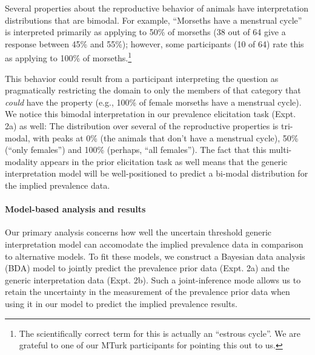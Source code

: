 \documentclass[floatsintext,doc]{apa6}
\theoremstyle{definition}
\theoremstyle{definition}
\theoremstyle{definition}
\theoremstyle{remark}
\begin{document}
Several properties about the reproductive behavior of animals have
interpretation distributions that are bimodal. For example,
\enquote{Morseths have a menstrual cycle} is interpreted primarily as
applying to 50\% of morseths (38 out of 64 give a response between 45\%
and 55\%); however, some participants (10 of 64) rate this as applying
to 100\% of morseths.\footnote{The scientifically correct term for this
  is actually an \enquote{estrous cycle}. We are grateful to one of our
  MTurk participants for pointing this out to us.} 
  
  This behavior could
result from a participant interpreting the question as pragmatically
restricting the domain to only the members of that category that
\emph{could} have the property (e.g., 100\% of female morseths have a
menstrual cycle). We notice this bimodal interpretation in our
prevalence elicitation task (Expt. 2a) as well: The distribution over
several of the reproductive properties is tri-modal, with peaks at 0\%
(the animals that don't have a menstrual cycle), 50\% (\enquote{only
females}) and 100\% (perhaps, \enquote{all females}). The fact that this
multi-modality appears in the prior elicitation task as well means that
the generic interpretation model will be well-positioned to predict a
bi-modal distribution for the implied prevalence data.

\paragraph{Model-based analysis and
results}\label{model-based-analysis-and-results-1}

Our primary analysis concerns how well the uncertain threshold generic
interpretation model can accomodate the implied prevalence data in
comparison to alternative models. To fit these models, we construct a
Bayesian data analysis (BDA) model to jointly predict the prevalence
prior data (Expt. 2a) and the generic interpretation data (Expt. 2b).
Such a joint-inference mode allows us to retain the uncertainty in the
measurement of the prevalence prior data when using it in our model to
predict the implied prevalence results. 
\end{document}

